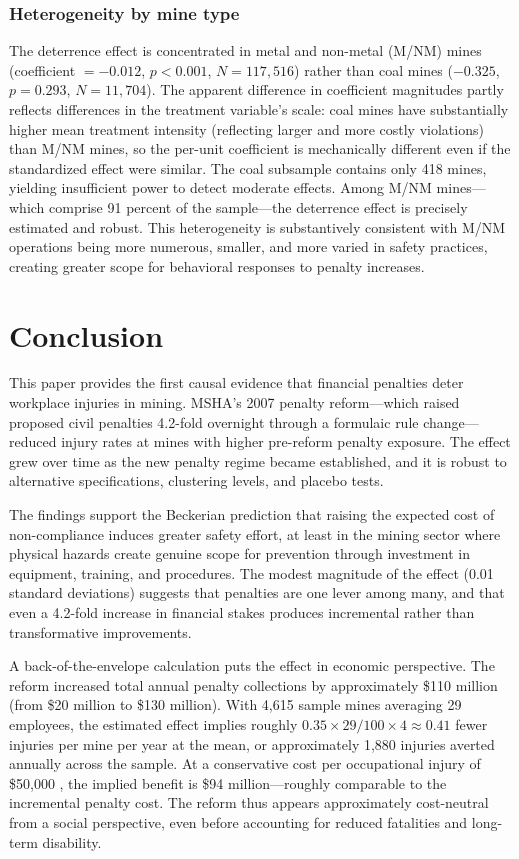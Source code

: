 \documentclass[12pt]{article}
\begin{document}
\subsubsection*{Heterogeneity by mine type} The deterrence effect is concentrated in metal and non-metal (M/NM) mines (coefficient $= -0.012$, $p < 0.001$, $N = 117{,}516$) rather than coal mines ($-0.325$, $p = 0.293$, $N = 11{,}704$). The apparent difference in coefficient magnitudes partly reflects differences in the treatment variable's scale: coal mines have substantially higher mean treatment intensity (reflecting larger and more costly violations) than M/NM mines, so the per-unit coefficient is mechanically different even if the standardized effect were similar. The coal subsample contains only 418 mines, yielding insufficient power to detect moderate effects. Among M/NM mines---which comprise 91 percent of the sample---the deterrence effect is precisely estimated and robust. This heterogeneity is substantively consistent with M/NM operations being more numerous, smaller, and more varied in safety practices, creating greater scope for behavioral responses to penalty increases.


\section{Conclusion}

This paper provides the first causal evidence that financial penalties deter workplace injuries in mining. MSHA's 2007 penalty reform---which raised proposed civil penalties 4.2-fold overnight through a formulaic rule change---reduced injury rates at mines with higher pre-reform penalty exposure. The effect grew over time as the new penalty regime became established, and it is robust to alternative specifications, clustering levels, and placebo tests.

The findings support the Beckerian prediction that raising the expected cost of non-compliance induces greater safety effort, at least in the mining sector where physical hazards create genuine scope for prevention through investment in equipment, training, and procedures. The modest magnitude of the effect (0.01 standard deviations) suggests that penalties are one lever among many, and that even a 4.2-fold increase in financial stakes produces incremental rather than transformative improvements.

A back-of-the-envelope calculation puts the effect in economic perspective. The reform increased total annual penalty collections by approximately \$110 million (from \$20 million to \$130 million). With 4,615 sample mines averaging 29 employees, the estimated effect implies roughly $0.35 \times 29 / 100 \times 4 \approx 0.41$ fewer injuries per mine per year at the mean, or approximately 1,880 injuries averted annually across the sample. At a conservative cost per occupational injury of \$50,000 \citep{ruser1985workers}, the implied benefit is \$94 million---roughly comparable to the incremental penalty cost. The reform thus appears approximately cost-neutral from a social perspective, even before accounting for reduced fatalities and long-term disability.
\end{document}
